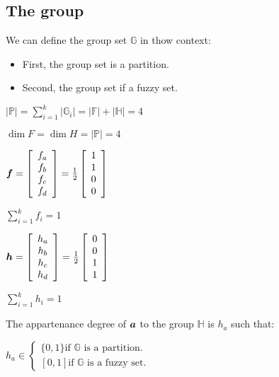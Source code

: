 \documentclass{article}
\newcommand{\bm}[1]{\mbox{\boldmath$#1$}}
\newcommand{\fm}[1]{\mathbb{#1}}
\newcommand{\df}[1]{|{\mathbb{#1}}|}
\begin{document}
\subsection{The group}

We can define the group set $\fm{G}$ in thow context:
\begin{itemize}
 \item First, the group set is a partition.
 \item Second, the group set if a fuzzy set.
\end{itemize}

$\df{P} = \sum_{i=1}^{k} |\fm{G}_i| = \df{F} + \df{H} = 4$

$\dim F = \dim H = \df{P} = 4$

$
\bm{f} = 
\left[\begin{array}{c}
 f_a \\
 f_b \\
 f_c \\
 f_d
\end{array}\right]
=
\frac{1}{2}
\left[\begin{array}{c}
 1 \\
 1 \\
 0 \\
 0
\end{array}\right]
$

$\sum_{i=1}^{k} f_i = 1$

$
\bm{h} = 
\left[\begin{array}{c}
 h_a \\
 h_b \\
 h_c \\
 h_d
\end{array}\right]
=
\frac{1}{2}
\left[\begin{array}{c}
 0 \\
 0 \\
 1 \\
 1
\end{array}\right]
$

$\sum_{i=1}^{k} h_i = 1$

The appartenance degree of $\bm{a}$ to the group $\fm{H}$ is $h_a$ such that:

$ h_a \in 
\begin{cases}
 \{0,1\} \text{if $\fm{G}$ is a partition.} \\
 [0,1]   \text{if $\fm{G}$ is a fuzzy set.}
\end{cases}
$

\end{document}
